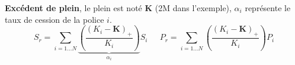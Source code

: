 \begin{f}
\begin{center}
\end{center}
\medskip

\textbf{Excédent de plein}, le plein est noté $\boldsymbol{K}$ (2M\EUR{} dans l'exemple), $\alpha_i$ représente le taux de cession de la police $i$.
	$$
	S_r= \sum_{i=1\ldots N}\underbrace{\left(\frac{\left(K_i-\boldsymbol{K} \right)_+ }{K_i} \right)}_{\alpha_i} S_i\quad \ \ P_r=\sum_{i=1\ldots N}\left(\frac{\left(K_i-\boldsymbol{K} \right)_+ }{K_i} \right)P_i 
	$$



\end{f}
